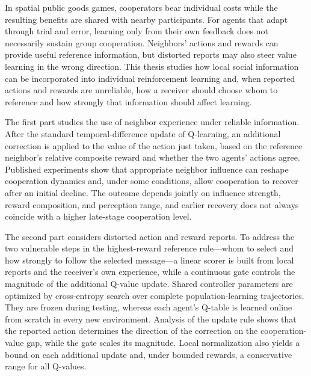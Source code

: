 \begin{abstract*}
In spatial public goods games, cooperators bear individual costs while the resulting benefits are shared with nearby participants. For agents that adapt through trial and error, learning only from their own feedback does not necessarily sustain group cooperation. Neighbors' actions and rewards can provide useful reference information, but distorted reports may also steer value learning in the wrong direction. This thesis studies how local social information can be incorporated into individual reinforcement learning and, when reported actions and rewards are unreliable, how a receiver should choose whom to reference and how strongly that information should affect learning.

The first part studies the use of neighbor experience under reliable information. After the standard temporal-difference update of Q-learning, an additional correction is applied to the value of the action just taken, based on the reference neighbor's relative composite reward and whether the two agents' actions agree. Published experiments show that appropriate neighbor influence can reshape cooperation dynamics and, under some conditions, allow cooperation to recover after an initial decline. The outcome depends jointly on influence strength, reward composition, and perception range, and earlier recovery does not always coincide with a higher late-stage cooperation level.

The second part considers distorted action and reward reports. To address the two vulnerable steps in the highest-reward reference rule---whom to select and how strongly to follow the selected message---a linear scorer is built from local reports and the receiver's own experience, while a continuous gate controls the magnitude of the additional Q-value update. Shared controller parameters are optimized by cross-entropy search over complete population-learning trajectories. They are frozen during testing, whereas each agent's Q-table is learned online from scratch in every new environment. Analysis of the update rule shows that the reported action determines the direction of the correction on the cooperation-value gap, while the gate scales its magnitude. Local normalization also yields a bound on each additional update and, under bounded rewards, a conservative range for all Q-values.


\end{abstract*}
